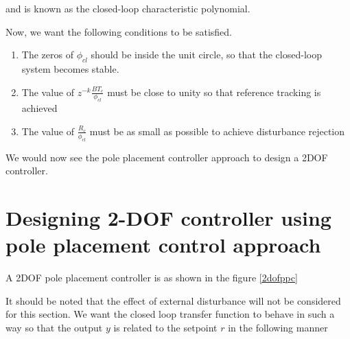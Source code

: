 and is known as the closed-loop characteristic polynomial.

Now, we want the following conditions to be satisfied.
\begin{enumerate}
\item The zeros of $\phi _{cl}$ should be inside the unit circle, so that the closed-loop system becomes stable. 
\item The value of $z^{-k}\frac{BT_c}{\phi _{cl}}$ must be close to unity so that reference tracking is achieved 
\item The value of $\frac{R_c}{\phi _{cl}}$ must be as small as possible to achieve disturbance rejection
\end{enumerate}
We would now see the pole placement controller approach to design a 2DOF controller.\cite{kmmdc09}

\section{Designing 2-DOF controller using pole placement control approach}
A 2DOF pole placement controller is as shown in the figure \ref{2dofppc}

It should be noted that the effect of external disturbance will not be considered for this section.
We want the closed loop transfer function to behave in such a way so that the output $y$ is related to the setpoint $r$ in the following manner
